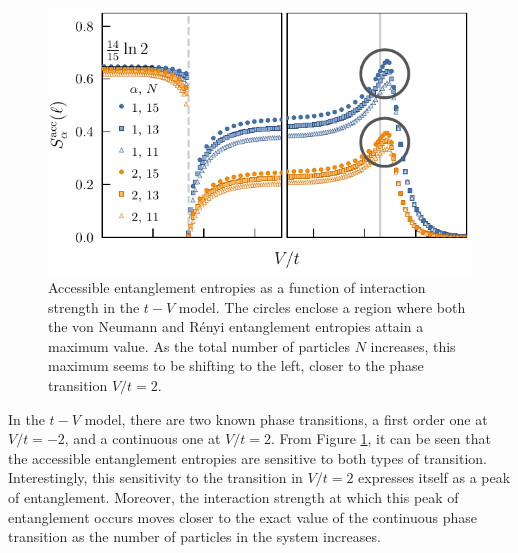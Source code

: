 	\begin{figure}[h]
	\begin{center}
	\includegraphics[scale=1.0]{operationalEntanglementEntropies_SOP5_withPeakCircles.pdf}
	\end{center}
	\caption{Accessible entanglement entropies as a function of interaction strength in the $t-V$ model. The circles enclose a region where both the von Neumann and R\'enyi entanglement entropies attain a maximum value. As the total number of particles $N$ increases, this maximum seems to be shifting to the left, closer to the phase transition $V/t=2$.}
	\label{fig:OEE_circledPeaks}
	\end{figure}
	
	In the $t-V$ model, there are two known phase transitions, a first order one at $V/t=-2$, and a continuous one at $V/t=2$. From Figure \ref{fig:OEE_circledPeaks}, it can be seen that the accessible entanglement entropies are sensitive to both types of transition. Interestingly, this sensitivity to the transition in $V/t=2$ expresses itself as a peak of entanglement. Moreover, the interaction strength at which this peak of entanglement occurs moves closer to the exact value of the continuous phase transition as the number of particles in the system increases.  
	
